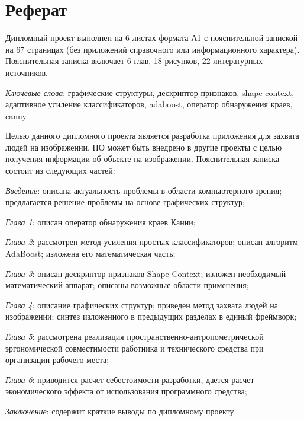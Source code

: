 \section*{Реферат}
\thispagestyle{empty}

Дипломный проект выполнен на 6 листах формата А1 с пояснительной запиской на 67 страницах (без приложений справочного или информационного характера). Пояснительная записка включает 6 глав, 18 рисунков, 22 литературных источников.

\emph{Ключевые слова}: графические структуры, дескриптор признаков, shape context, адаптивное усиление классификаторов, adaboost, оператор обнаружения краев, canny.

Целью данного дипломного проекта является разработка приложения для захвата людей на изображении. ПО может быть внедрено в другие проекты с целью получения информации об объекте на изображении. Пояснительная записка состоит из следующих частей:

\emph{Введение}: описана актуальность проблемы в области компьютерного зрения; предлагается решение проблемы на основе графических структур;

\emph{Глава 1}: описан оператор обнаружения краев Канни;

\emph{Глава 2}: рассмотрен метод усиления простых классификаторов; описан алгоритм AdaBoost; изложена его математическая часть;

\emph{Глава 3}: описан дескриптор признаков Shape Context; изложен необходимый математический аппарат; описаны возможные области применения;

\emph{Глава 4}: описание графических структур; приведен метод захвата людей на изображении; синтез изложенного в предыдущих разделах в единый фреймворк;

\emph{Глава 5}: рассмотрена реализация пространственно\hyp{}антропометрической эргономической совместимости работника и технического средства при организации рабочего места;

\emph{Глава 6}: приводится расчет себестоимости разработки, дается расчет экономического эффекта от использования программного средства;

\emph{Заключение}: содержит краткие выводы по дипломному проекту.

\newpage
